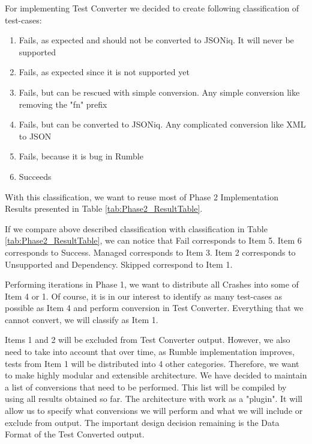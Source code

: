 For implementing Test Converter we decided to create following classification of test-cases:
\begin{enumerate}
	\item Fails, as expected and should not be converted to JSONiq. It will never be supported
	\item Fails, as expected since it is not supported yet
	\item Fails, but can be rescued with simple conversion. Any simple conversion like removing the "fn" prefix 
	\item Fails, but can be converted to JSONiq. Any complicated conversion like XML to JSON
	\item Fails, because it is bug in Rumble
	\item Succeeds
\end{enumerate}

With this classification, we want to reuse most of Phase 2 Implementation Results presented in Table \ref{tab:Phase2_ResultTable}.

If we compare above described classification with classification in Table \ref{tab:Phase2_ResultTable}, we can notice that Fail corresponds to Item 5. Item 6 corresponds to Success. Managed corresponds to Item 3. Item 2 corresponds to Unsupported and Dependency. Skipped correspond to Item 1. 

Performing iterations in Phase 1, we want to distribute all Crashes into some of Item 4 or 1. Of course, it is in our interest to identify as many test-cases as possible as Item 4 and perform conversion in Test Converter. Everything that we cannot convert, we will classify as Item 1. 

Items 1 and 2 will be excluded from Test Converter output. However, we also need to take into account that over time, as Rumble implementation improves, tests from Item 1 will be distributed into 4 other categories. Therefore, we want to make highly modular and extensible architecture. We have decided to maintain a list of conversions that need to be performed. This list will be compiled by using all results obtained so far. The architecture with work as a "plugin". It will allow us to specify what conversions we will perform and what we will include or exclude from output. The important design decision remaining is the Data Format of the Test Converted output.

